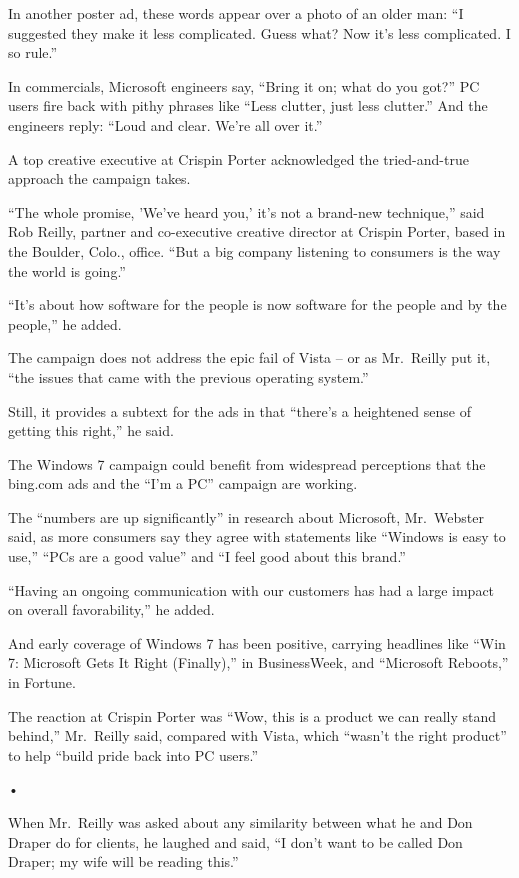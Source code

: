 ﻿\documentclass[12pt]{article}
\begin{document}
In another poster ad, these words appear over a photo of an older man: ``I suggested they make it
less complicated. Guess what? Now it's less complicated. I so rule.''

In commercials, Microsoft engineers say, ``Bring it on; what do you got?'' PC users fire back with
pithy phrases like ``Less clutter, just less clutter.'' And the engineers reply: ``Loud and clear.
We're all over it.''

A top creative executive at Crispin Porter acknowledged the tried-and-true approach the campaign
takes.

``The whole promise, 'We've heard you,' it's not a brand-new technique,'' said Rob Reilly, partner
and co-executive creative director at Crispin Porter, based in the Boulder, Colo., office. ``But a
big company listening to consumers is the way the world is going.''

``It's about how software for the people is now software for the people and by the people,'' he
added.

The campaign does not address the epic fail of Vista -- or as Mr.~Reilly put it, ``the issues that
came with the previous operating system.''

Still, it provides a subtext for the ads in that ``there's a heightened sense of getting this
right,'' he said.

The Windows 7 campaign could benefit from widespread perceptions that the bing.com ads and the ``I'm
a PC'' campaign are working.

The ``numbers are up significantly'' in research about Microsoft, Mr.~Webster said, as more
consumers say they agree with statements like ``Windows is easy to use,'' ``PCs are a good value''
and ``I feel good about this brand.''

``Having an ongoing communication with our customers has had a large impact on overall
favorability,'' he added.

And early coverage of Windows 7 has been positive, carrying headlines like ``Win 7: Microsoft Gets
It Right (Finally),'' in BusinessWeek, and ``Microsoft Reboots,'' in Fortune.

The reaction at Crispin Porter was ``Wow, this is a product we can really stand behind,'' Mr.~Reilly
said, compared with Vista, which ``wasn't the right product'' to help ``build pride back into PC
users.''

•

When Mr.~Reilly was asked about any similarity between what he and Don Draper do for clients, he
laughed and said, ``I don't want to be called Don Draper; my wife will be reading this.''
\end{document}
